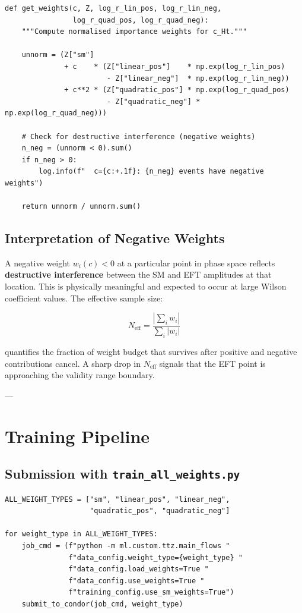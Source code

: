 \documentclass[11pt,a4paper]{article}
\begin{document}
\begin{lstlisting}
def get_weights(c, Z, log_r_lin_pos, log_r_lin_neg, 
                log_r_quad_pos, log_r_quad_neg):
    """Compute normalised importance weights for c_Ht."""
    
    unnorm = (Z["sm"]
              + c    * (Z["linear_pos"]    * np.exp(log_r_lin_pos)
                        - Z["linear_neg"]  * np.exp(log_r_lin_neg))
              + c**2 * (Z["quadratic_pos"] * np.exp(log_r_quad_pos)
                        - Z["quadratic_neg"] * np.exp(log_r_quad_neg)))
    
    # Check for destructive interference (negative weights)
    n_neg = (unnorm < 0).sum()
    if n_neg > 0:
        log.info(f"  c={c:+.1f}: {n_neg} events have negative weights")
    
    return unnorm / unnorm.sum()
\end{lstlisting}

\subsection{Interpretation of Negative Weights}

A negative weight $w_i(c) < 0$ at a particular point in phase space reflects \textbf{destructive interference} 
between the SM and EFT amplitudes at that location. This is physically meaningful and expected to occur at 
large Wilson coefficient values. The effective sample size:

\begin{equation}
N_{\text{eff}} = \frac{\left|\sum_i w_i\right|}{\sum_i |w_i|}
\end{equation}

quantifies the fraction of weight budget that survives after positive and negative contributions cancel. 
A sharp drop in $N_{\text{eff}}$ signals that the EFT point is approaching the validity range boundary.

---

\section{Training Pipeline}

\subsection{Submission with \texttt{train\_all\_weights.py}}

\begin{lstlisting}
ALL_WEIGHT_TYPES = ["sm", "linear_pos", "linear_neg", 
                    "quadratic_pos", "quadratic_neg"]

for weight_type in ALL_WEIGHT_TYPES:
    job_cmd = (f"python -m ml.custom.ttz.main_flows "
               f"data_config.weight_type={weight_type} "
               f"data_config.load_weights=True "
               f"data_config.use_weights=True "
               f"training_config.use_sm_weights=True")
    submit_to_condor(job_cmd, weight_type)
\end{lstlisting}
\end{document}
